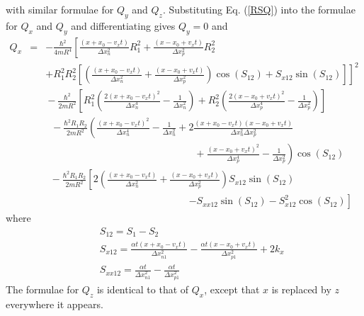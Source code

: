 \documentclass[12pt]{article}       %
\begin{document}
with similar formulae for $Q_y$ and $Q_z$. Substituting Eq. (\ref{RSQ}) into the formulae for $Q_x$ and $Q_y$  and differentiating gives $Q_y=0$ and
\begin{eqnarray}
Q_x&=&- \frac{\hbar^2}{4mR^4} \left[ \frac{(x+x_0-v_x t)}{\Delta x_n^2}R_1^2+\frac{(x-x_0+v_x t)}{\Delta x_p^2}R_2^2          \right.        \nonumber\\
&&+ \left.  R_1^2 R_2^2 \left[     \left(  \frac{(x+x_0-v_x t)}{\Delta x_n^2}+\frac{(x-x_0+v_x t)}{\Delta x_p^2}  \right)  \cos(S_{12}) +S_{x12}\sin(S_{12})
      \right]\right]^2\nonumber\\
&&\!\!\!\!\!\!\!\!\!\!-\frac{\hbar^2}{2mR^2} \left[           R_1^2      \left(    \frac{2(x+x_0-v_x t)^2}{\Delta x_n^4}-\frac{1}{\Delta x_n^2}    \right) +  R_2^2\left(\frac{2(x-x_0+v_x t)^2}{\Delta x_p^4}-\frac{1}{\Delta x_p^2}    \right)           \right]    \nonumber\\
&&\;\;-\frac{\hbar^2R_1 R_2}{2mR^2}    \left(  \frac{(x+x_0-v_x t)^2}{\Delta x_n^4}-\frac{1}{\Delta x_n^2}+2\frac{(x+x_0-v_x t)(x-x_0+v_x t)}{\Delta x_n^2 \Delta x_p^2}  \right. \nonumber\\
&&\;\;\;\;\;\;\;\;\;\;\;\;\;\;\;\;\;\;\;\;\;\;\;\;\;\;\;\;\; \;\;\;\;\;\;\;\;\;\;\;\;\;\;\;\;\;\;\;\;\;\;\;\;\;+ \left. \frac{(x-x_0+v_x t)^2}{\Delta x_p^4}     -      \frac{1}{\Delta x_p^2}       \right)\cos(S_{12}) \nonumber\\
&&\;\,-\frac{\hbar^2R_1 R_2}{2mR^2}    \left[  2\left(   \frac{(x+x_0-v_x t)}{\Delta x_n^2}+\frac{(x-x_0+v_x t)}{\Delta x_p^2}  \right)S_{x12} \sin(S_{12})    \right. \nonumber\\
&&\;\;\;\;\;\;\;\;\;\;\;\;\;\;\;\;\;\;\;\;\;\;\;\;\;\;\;\;\;\;\;\;\;\;\;\;\;\;\;\;\;\;\;\;\;\;\;\;\;\;\;\;  \left. - S_{xx12}\sin(S_{12}) - S_{x12}^2 \cos(S_{12})               \right]\label{QPX}
\end{eqnarray}
where 
\begin{eqnarray}
&&\!\!\!\!\!\!\!\!\!\!\!\!\! S_{12}=S_1-S_2 \nonumber\\
&&\!\!\!\!\!\!\!\!\!\!\!\!\! S_{x12}=  \frac{\alpha t(x+x_0-v_x t)}{\Delta x_{n1}^2}  - \frac{\alpha t(x-x_0+v_x t)}{\Delta x_{p1}^2} + 2k_x\nonumber\\
&&\!\!\!\!\!\!\!\!\!\!\!\!\! S_{xx12}=  \frac{\alpha t}{\Delta x_{n1}^2}  - \frac{\alpha t}{\Delta x_{p1}^2}\nonumber
\end{eqnarray}
The formulae for $Q_z$ is identical to that of $Q_x$, except that $x$ is replaced by $z$ everywhere it appears.
\end{document}
